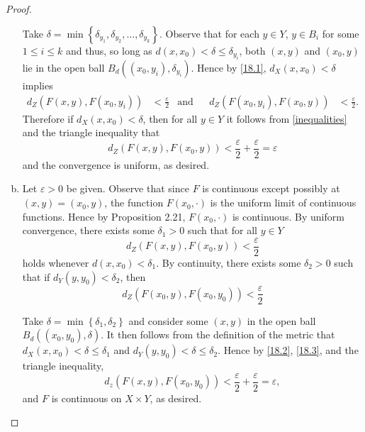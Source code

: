 \documentclass[12pt]{amsart}
\begin{document}
\begin{setup}
\begin{proof}
\begin{enumerate}[(a)]
      Take $\delta = \min \left\{\delta_{y_1}, \delta_{y_2}, \ldots, \delta_{y_k}\right\}$.
      Observe that for each $y \in Y$,  $y \in B_i$ for some $1 \leq i \leq k$ and thus, so long as $d(x, x_0) < \delta \leq \delta_{y_i}$, both $(x, y)$ and $(x_0, y)$ lie in the open ball $B_d\left(\left(x_0, y_i\right), \delta_{y_i}\right)$.
      Hence by \eqref{18.1}, $d_X(x,x_0) < \delta$ implies
      \begin{align*}\label{inequalities}\tag{$\ast$}
        d_Z\left(F\left(x, y\right), F\left(x_0, y_i\right)\right) &< \frac{\varepsilon}{2} & \text{and}&& d_Z\left(F\left(x_0, y_i\right), F\left(x_0, y\right)\right) &< \frac{\varepsilon}{2}.
      \end{align*}
      Therefore if $d_X(x,x_0) < \delta$, then for all $y \in Y$ it follows from \eqref{inequalities} and the triangle inequality that
      $$d_Z(F(x, y), F(x_0, y)) < \frac{\varepsilon}{2} + \frac{\varepsilon}{2} = \varepsilon$$
      and the convergence is uniform, as desired.
    \item
      Let $\varepsilon > 0$ be given.
      Observe that since $F$ is continuous except possibly at $(x,y) = (x_0, y)$, the function $F(x_0, \cdot)$ is the uniform limit of continuous functions.
      Hence by Proposition 2.21, $F(x_0, \cdot)$ is continuous.
      By uniform convergence, there exists some $\delta_1 > 0$ such that for all $y \in Y$
      \begin{equation}\label{18.2}
        d_Z\left(F\left(x,y\right), F\left(x_0, y\right)\right) < \frac{\varepsilon}{2}
      \end{equation}
      holds whenever $d(x, x_0) < \delta_1$.
      By continuity, there exists some $\delta_2 > 0$ such that if $d_Y(y,y_0) < \delta_2$, then
      \begin{equation}\label{18.3}
        d_Z\left(F\left(x_0,y\right), F\left(x_0, y_0\right)\right) < \frac{\varepsilon}{2}
      \end{equation}

      Take $\delta = \min \left\{\delta_1, \delta_2\right\}$ and consider some $(x,y)$ in the open ball $B_d((x_0, y_0), \delta)$.
      It then follows from the definition of the metric that $d_X(x, x_0) < \delta \leq \delta_1$ and $d_Y(y,y_0) < \delta \leq \delta_2$.
      Hence by \eqref{18.2}, \eqref{18.3}, and the triangle inequality,
      $$d_z\left(F\left(x,y\right), F\left(x_0,y_0\right)\right) < \frac{\varepsilon}{2} + \frac{\varepsilon}{2} = \varepsilon,$$
      and $F$ is continuous on $X \times Y$, as desired.
    \end{enumerate}
  \end{proof}
\end{setup}
\end{document}
